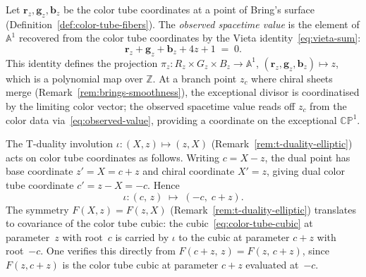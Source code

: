 \begin{definition}
\label{def:observed-value}
  Let $\mathbf{r}_z, \mathbf{g}_z, \mathbf{b}_z$ be the color tube
  coordinates at a point of Bring's surface
  (Definition~\ref{def:color-tube-fibers}).  The
  \emph{observed spacetime value} is the element of $\mathbb{A}^1$
  recovered from the color tube coordinates by the Vieta
  identity~\eqref{eq:vieta-sum}:
  \begin{equation}\label{eq:observed-value}
    \mathbf{r}_z + \mathbf{g}_z + \mathbf{b}_z + 4z + 1 \;=\; 0.
  \end{equation}
  This identity defines the projection
  $\pi_z \colon R_z \times G_z \times B_z \to \mathbb{A}^1$,
  $({\mathbf{r}_z, \mathbf{g}_z, \mathbf{b}_z}) \mapsto z$,
  which is a polynomial map over $\mathbb{Z}$.  At a branch
  point $z_c$ where chiral sheets merge
  (Remark~\ref{rem:brings-smoothness}), the exceptional divisor is
  coordinatised by the limiting color vector; the observed spacetime
  value reads off $z_c$ from the color data via~\eqref{eq:observed-value},
  providing a coordinate on the exceptional $\mathbb{CP}^1$.
\end{definition}

\begin{remark}
\label{rem:t-duality-color-tube}
  The T-duality involution $\iota \colon (X, z) \mapsto (z, X)$
  (Remark~\ref{rem:t-duality-elliptic}) acts on color tube
  coordinates as follows.  Writing $c = X - z$, the dual point has
  base coordinate $z' = X = c + z$ and chiral coordinate $X' = z$,
  giving dual color tube coordinate $c' = z - X = -c$.  Hence
  \begin{equation}\label{eq:t-duality-color-tube}
    \iota \colon (c,\, z) \;\longmapsto\; (-c,\; c + z).
  \end{equation}
  The symmetry $F(X,z) = F(z,X)$
  (Remark~\ref{rem:t-duality-elliptic}) translates to covariance of
  the color tube cubic: the cubic~\eqref{eq:color-tube-cubic} at
  parameter~$z$ with root~$c$ is carried by $\iota$ to the cubic at
  parameter $c + z$ with root~$-c$.  One verifies this directly from
  $F(c+z,\, z) = F(z,\, c+z)$, since $F(z, c+z)$ is the color tube
  cubic at parameter $c+z$ evaluated at~$-c$.
\end{remark}

